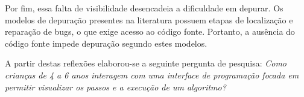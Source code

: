 Por fim, essa falta de visibilidade desencadeia a dificuldade em depurar. Os modelos de depuração presentes na literatura \cite{carver_assessing_1986, mccauley_debugging_2008} possuem etapas de localização e reparação de bugs, o que exige acesso ao código fonte. Portanto, a ausência do código fonte impede depuração segundo estes modelos.

A partir destas reflexões elaborou-se a seguinte pergunta de pesquisa:
\textit{Como crianças de 4 a 6 anos interagem com uma interface de programação focada em permitir visualizar os passos e a execução de um algoritmo?}








